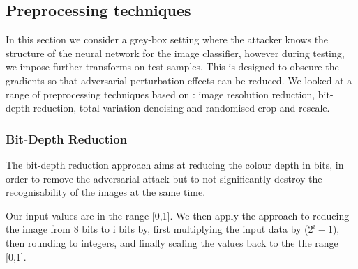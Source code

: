 \subsection{Preprocessing techniques}

In this section we consider a grey-box setting where the attacker knows the structure of the neural network for the image classifier, however during testing, we impose further transforms on test samples. This is designed to obscure the gradients so that adversarial perturbation effects can be reduced. We looked at a range of preprocessing techniques based on \cite{Guo18}: image resolution reduction, bit-depth reduction, total variation denoising and randomised crop-and-rescale.


\subsubsection{Bit-Depth Reduction} %
The bit-depth reduction approach \cite{DBLP:journals/corr/XuEQ17} aims at reducing the colour depth in bits, in order to remove the adversarial attack but to not significantly destroy the recognisability of the images at the same time. 

Our input values are in the range [0,1]. We then apply the approach to reducing the image from 8 bits to i bits by, first multiplying the input data by ($2^i - 1$), then rounding to integers, and finally scaling the values back to the the range [0,1].

